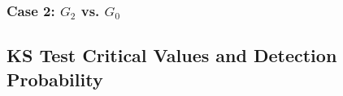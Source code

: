 \documentclass{article}
\begin{document}






\subsubsection{Case 2: \(G_2\) vs. \(G_0\)}







\subsection{KS Test Critical Values and Detection Probability}


\end{document}
